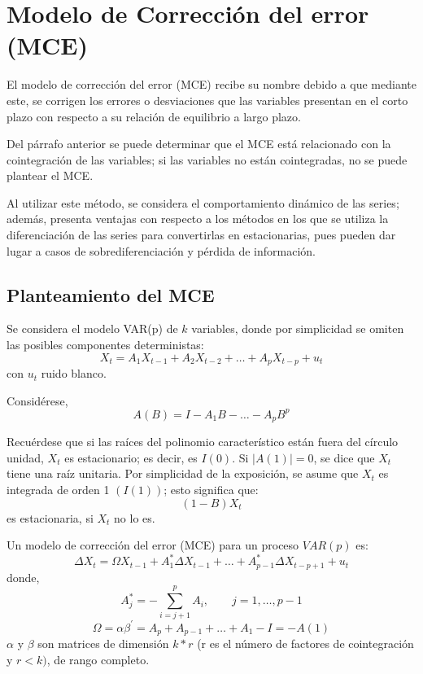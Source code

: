 
\chapter{Modelo de Correcci\'{o}n del error (MCE)}
El modelo de correcci\'{o}n del error (MCE) recibe su nombre debido a que mediante este, se corrigen los errores o desviaciones que las variables presentan en el corto plazo con respecto a su relaci\'{o}n de equilibrio a largo plazo.\newline

Del p\'{a}rrafo anterior se puede determinar que el MCE est\'{a} relacionado con la cointegraci\'{o}n de las variables; si las variables no est\'{a}n cointegradas, no se puede plantear el MCE.\newline

Al utilizar este m\'{e}todo, se considera el comportamiento din\'{a}mico de las series; adem\'{a}s, presenta ventajas con respecto a los m\'{e}todos en los que se utiliza la diferenciaci\'{o}n de las series para convertirlas en estacionarias, pues pueden dar lugar a casos de sobrediferenciaci\'{o}n y p\'{e}rdida de informaci\'{o}n.

\section{Planteamiento del MCE}
Se considera el modelo VAR(p) de $k$ variables, donde por simplicidad se omiten las posibles componentes deterministas: 
\[
X_{t}=A_{1}X_{t-1}+A_{2}X_{t-2}+\ldots +A_{p}X_{t-p}+u_{t}
\]
con $u_{t}$ ruido blanco.\newline

Consid\'{e}rese, 
\[
A(B)=I-A_{1}B-\ldots -A_{p}B^{p}
\]

Recu\'{e}rdese que si las ra\'{i}ces del polinomio caracter\'{i}stico est\'{a}n fuera del c\'{i}rculo unidad, $X_{t}$ es estacionario; es decir, es $I(0)$. Si $|A(1)|=0$, se dice que $X_{t}$ tiene una ra\'{i}z unitaria. Por simplicidad de la exposici\'{o}n, se asume que $X_{t}$ es integrada de orden 1 $(I(1))$; esto significa que: 
\[
(1-B)X_{t}
\]
es estacionaria, si $X_{t}$ no lo es.\newline

Un modelo de correcci\'{o}n del error (MCE) para un proceso $VAR(p)$ es:
\[
\Delta X_{t}=\Omega X_{t-1}+A_{1}^{\ast}\Delta X_{t-1}+\ldots +A_{p-1}^{\ast}\Delta X_{t-p+1}+u_{t}
\]
donde, 
\[
A_{j}^{\ast }=-\sum\limits_{i=j+1}^p A_{i} ,\qquad j=1,\ldots ,p-1
\]
\[
\Omega =\alpha \beta^{'} = A_{p}+A_{p-1}+\ldots +A_{1}-I=-A(1)
\]
$\alpha$ y $\beta$ son matrices de dimensi\'{o}n $k*r$ (r es el n\'{u}mero de factores de cointegraci\'{o}n y $r<k)$, de rango completo.\newline

